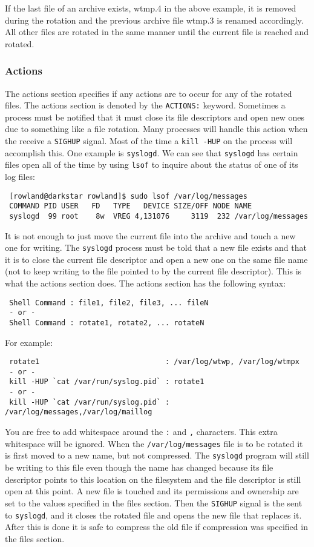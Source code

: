 \documentclass{article}
\begin{document}
If the last file of an archive exists, wtmp.4 in the above example, it
is removed during the rotation and the previous archive file wtmp.3 is
renamed accordingly.  All other files are rotated in the same manner
until the current file is reached and rotated.

\subsubsection*{Actions}%

The actions section specifies if any actions are to occur for any of the
rotated files.  The actions section is denoted by the {\tt ACTIONS:}
keyword.  Sometimes a process must be notified that it must close its
file descriptors and open new ones due to something like a file
rotation.  Many processes will handle this action when the receive a
{\tt SIGHUP} signal.  Most of the time a {\tt kill -HUP} on the process will
accomplish this.  One example is {\tt syslogd}.  We can see that {\tt syslogd}
has certain files open all of the time by using {\tt lsof} to inquire about
the status of one of its log files:
\begin{verbatim}
 [rowland@darkstar rowland]$ sudo lsof /var/log/messages
 COMMAND PID USER   FD   TYPE   DEVICE SIZE/OFF NODE NAME
 syslogd  99 root    8w  VREG 4,131076     3119  232 /var/log/messages
\end{verbatim}

It is not enough to just move the current file into the archive and
touch a new one for writing.  The {\tt syslogd} process must be told that a
new file exists and that it is to close the current file descriptor and
open a new one on the same file name (not to keep writing to the file
pointed to by the current file descriptor).  This is what the actions
section does.  The actions section has the following syntax:
\begin{verbatim}
 Shell Command : file1, file2, file3, ... fileN
 - or -
 Shell Command : rotate1, rotate2, ... rotateN
\end{verbatim}

For example:
\begin{verbatim}
 rotate1                             : /var/log/wtwp, /var/log/wtmpx
 - or -
 kill -HUP `cat /var/run/syslog.pid` : rotate1
 - or -
 kill -HUP `cat /var/run/syslog.pid` : /var/log/messages,/var/log/maillog
\end{verbatim}

You are free to add whitespace around the {\tt :} and {\tt ,} characters.
This extra whitespace will be ignored.  When the {\tt /var/log/messages}
file is to be rotated it is first moved to a new name, but not
compressed.  The {\tt syslogd} program will still be writing to this file
even though the name has changed because its file descriptor points to
this location on the filesystem and the file descriptor is still open at
this point.  A new file is touched and its permissions and ownership are
set to the values specified in the files section.  Then the {\tt SIGHUP}
signal is the sent to {\tt syslogd}, and it closes the rotated file and
opens the new file that replaces it.  After this is done it is safe to
compress the old file if compression was specified in the files section.
\end{document}
